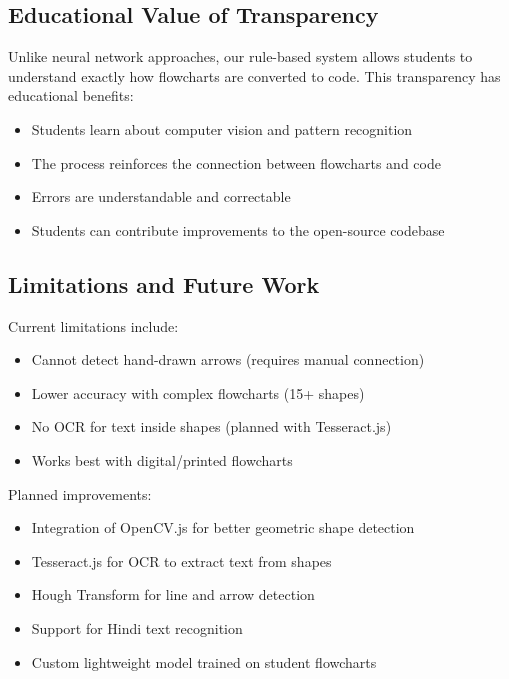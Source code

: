 \documentclass[11pt,a4paper]{article}
\begin{document}
\subsection{Educational Value of Transparency}

Unlike neural network approaches, our rule-based system allows students to understand exactly how flowcharts are converted to code. This transparency has educational benefits:

\begin{itemize}[leftmargin=*]
    \item Students learn about computer vision and pattern recognition
    \item The process reinforces the connection between flowcharts and code
    \item Errors are understandable and correctable
    \item Students can contribute improvements to the open-source codebase
\end{itemize}

\subsection{Limitations and Future Work}

Current limitations include:

\begin{itemize}[leftmargin=*]
    \item Cannot detect hand-drawn arrows (requires manual connection)
    \item Lower accuracy with complex flowcharts (15+ shapes)
    \item No OCR for text inside shapes (planned with Tesseract.js)
    \item Works best with digital/printed flowcharts
\end{itemize}

Planned improvements:

\begin{itemize}[leftmargin=*]
    \item Integration of OpenCV.js for better geometric shape detection
    \item Tesseract.js for OCR to extract text from shapes
    \item Hough Transform for line and arrow detection
    \item Support for Hindi text recognition
    \item Custom lightweight model trained on student flowcharts
\end{itemize}
\end{document}
